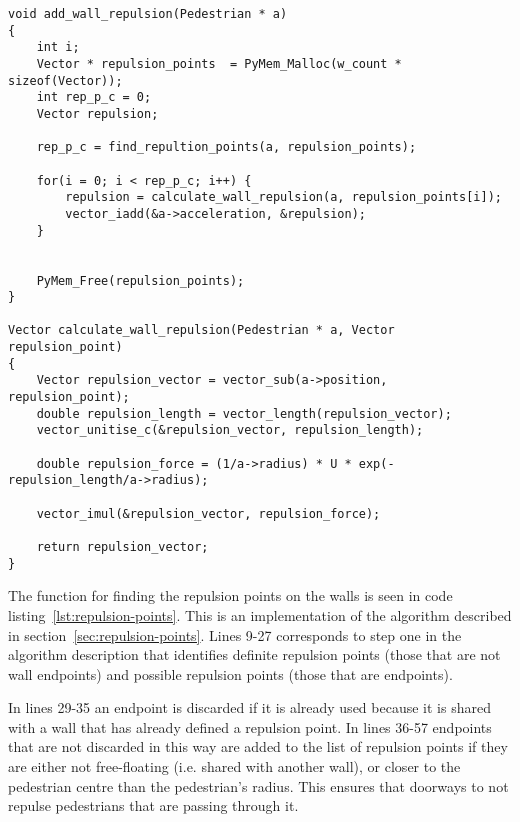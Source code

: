 \begin{lstlisting}[caption={Calculating the repulsion from the 
    walls.},label=lst:wall-repulsion]
void add_wall_repulsion(Pedestrian * a)
{
    int i;
    Vector * repulsion_points  = PyMem_Malloc(w_count * sizeof(Vector));
    int rep_p_c = 0;
    Vector repulsion;

    rep_p_c = find_repultion_points(a, repulsion_points);

    for(i = 0; i < rep_p_c; i++) {
        repulsion = calculate_wall_repulsion(a, repulsion_points[i]);
        vector_iadd(&a->acceleration, &repulsion);
    }


    PyMem_Free(repulsion_points);
}

Vector calculate_wall_repulsion(Pedestrian * a, Vector repulsion_point)
{
    Vector repulsion_vector = vector_sub(a->position, repulsion_point);
    double repulsion_length = vector_length(repulsion_vector);
    vector_unitise_c(&repulsion_vector, repulsion_length);

    double repulsion_force = (1/a->radius) * U * exp(-repulsion_length/a->radius);

    vector_imul(&repulsion_vector, repulsion_force);

    return repulsion_vector;
}
\end{lstlisting}

The function for finding the repulsion points on the walls is seen in code 
listing~\ref{lst:repulsion-points}. This is an implementation of the algorithm 
described in section~\ref{sec:repulsion-points}. Lines 9-27 corresponds to 
step one in the algorithm description that identifies definite repulsion 
points (those that are not wall endpoints) and possible repulsion points 
(those that are endpoints).

In lines 29-35 an endpoint is discarded if it is already used because it is 
shared with a wall that has already defined a repulsion point. In lines 36-57 
endpoints that are not discarded in this way are added to the list of 
repulsion points if they are either not free-floating (i.e. shared with 
another wall), or closer to the pedestrian centre than the pedestrian's radius. This 
ensures that doorways to not repulse pedestrians that are passing through it.

